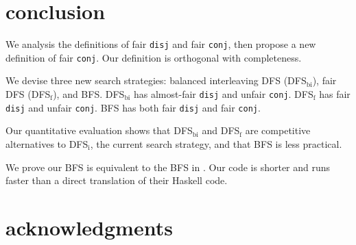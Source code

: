 \documentclass[format=acmlarge, review=true, authordraft=true]{acmart}
\newcommand{\conj}{\texttt{conj}}
\newcommand{\disj}{\texttt{disj}}
\begin{document}
\section{conclusion}

We analysis the definitions of fair \disj{} and fair \conj{}, then propose a 
new definition of fair \conj{}. Our definition is orthogonal with completeness.

We devise three new search strategies: balanced interleaving DFS (DFS$_\textrm{bi}$), fair 
DFS (DFS$_\textrm{f}$), and BFS. DFS$_\textrm{bi}$ has almost-fair \disj{} and unfair \conj{}. DFS$_\textrm{f}$ has 
fair \disj{} and unfair \conj{}. BFS has both fair \disj{} and fair \conj{}.

Our quantitative evaluation shows that DFS$_\textrm{bi}$ and DFS$_\textrm{f}$ are competitive 
alternatives to DFS$_\textrm{i}$, the current search strategy, and that BFS is less 
practical.

We prove our BFS is equivalent to the BFS in \citep{seres1999algebra}. Our code 
is shorter and runs faster than a direct translation of their Haskell code.

\section*{acknowledgments}



\end{document}
